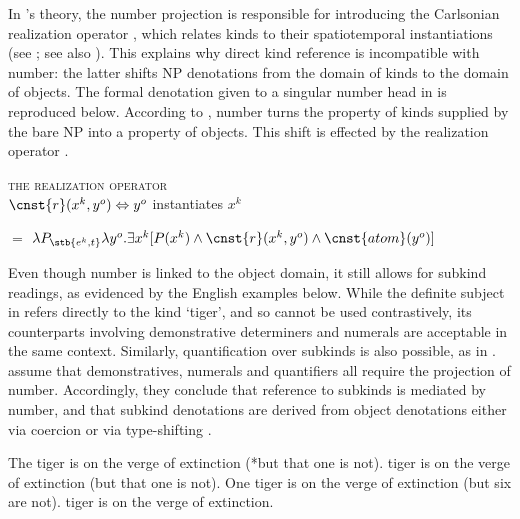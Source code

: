 \documentclass[output=paper]{langscibook}
\begin{document}
\noindent
In \citeauthor{Borik.Espinal2012}'s theory, the number projection is responsible for introducing the Carlsonian realization operator , which relates kinds to their spatiotemporal instantiations (see ; see also \citealt{Carlson1977}). This explains why direct kind reference is incompatible with number: the latter shifts NP denotations from the domain of kinds to the domain of objects. The formal denotation given to a singular number head in \citet{Borik.Espinal2015} is reproduced below. According to , number turns the property of kinds supplied by the bare NP into a property of objects. This shift is effected by the realization operator .

\ea \textsc{the realization operator}\label{def:realization_operator}\\
    $\cnst{r}(x^k, y^o) \Leftrightarrow y^o$ instantiates $x^k$
\z




\ea {} $=$ $\lambda P_{\stb{e^k,t}}\lambda y^o.\exists x^k [P(x^k) \wedge \cnst{r}(x^k, y^o) \wedge \cnst{atom}(y^o)]$ \label{ex:number}
\z


\noindent
Even though number is linked to the object domain, it still allows for subkind readings, as evidenced by the English examples below. While the definite subject in  refers directly to the kind `tiger', and so cannot be used contrastively, its counterparts involving demonstrative determiners  and numerals  are acceptable in the same context. Similarly, quantification over subkinds is also possible, as in . \citeauthor{Borik.Espinal2012} assume that demonstratives, numerals and quantifiers all require the projection of number. Accordingly, they conclude that reference to subkinds is mediated by number, and that subkind denotations are derived from object denotations either via coercion \citep{Borik.Espinal2012} or via type-shifting \citep{Borik.Espinal2015}.

\ea
\ea The tiger is on the verge of extinction (*but that one is not). \label{ex:tiger-kind}
 tiger is on the verge of extinction (but that one is not). \label{ex:tiger-dem}
\ex One tiger is on the verge of extinction (but six are not). \label{ex:tiger-num}
 tiger is on the verge of extinction.
\label{ex:tiger-quant}
\z \z
\end{document}
